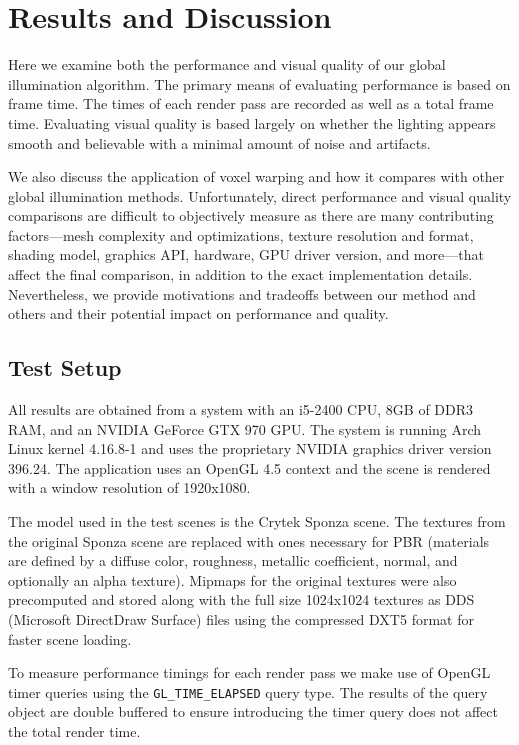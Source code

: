 \chapter{Results and Discussion}

Here we examine both the performance and visual quality of our global illumination algorithm. The primary means of evaluating performance is based on frame time. The times of each render pass are recorded as well as a total frame time. Evaluating visual quality is based largely on whether the lighting appears smooth and believable with a minimal amount of noise and artifacts.

We also discuss the application of voxel warping and how it compares with other global illumination methods. Unfortunately, direct performance and visual quality comparisons are difficult to objectively measure as there are many contributing factors---mesh complexity and optimizations, texture resolution and format, shading model, graphics API, hardware, GPU driver version, and more---that affect the final comparison, in addition to the exact implementation details. Nevertheless, we provide motivations and tradeoffs between our method and others and their potential impact on performance and quality.

\section{Test Setup}
All results are obtained from a system with an i5-2400 CPU, 8GB of DDR3 RAM, and an NVIDIA GeForce GTX 970 GPU. The system is running Arch Linux kernel 4.16.8-1 and uses the proprietary NVIDIA graphics driver version 396.24. The application uses an OpenGL 4.5 context and the scene is rendered with a window resolution of 1920x1080.

The model used in the test scenes is the Crytek Sponza scene. The textures from the original Sponza scene are replaced with ones necessary for PBR (materials are defined by a diffuse color, roughness, metallic coefficient, normal, and optionally an alpha texture). Mipmaps for the original textures were also precomputed and stored along with the full size 1024x1024 textures as DDS (Microsoft DirectDraw Surface) files using the compressed DXT5 format for faster scene loading.

To measure performance timings for each render pass we make use of OpenGL timer queries using the \verb#GL_TIME_ELAPSED# query type. The results of the query object are double buffered to ensure introducing the timer query does not affect the total render time.

